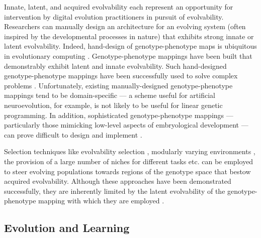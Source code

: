 Innate, latent, and acquired evolvability each represent an opportunity for intervention by digital evolution practitioners in pursuit of evolvability.
Researchers can manually design an architecture for an evolving system (often inspired by the developmental processes in nature) that exhibits strong innate \cite{clune2011performance} or latent \cite{reisinger2005towards} evolvability.
Indeed, hand-design of genotype-phenotype maps is ubiquitous in evolutionary computing \cite{wagner1996perspective}.
Genotype-phenotype mappings have been built that demonstrably exhibit latent \cite{reisinger2007acquiring} and innate \cite{stanley2009hypercube, clune2011performance} evolvability.
Such hand-designed genotype-phenotype mappings have been successfully used to solve complex problems \cite{woolley2010evolving, cheney2013unshackling}.
Unfortunately, existing manually-designed genotype-phenotype mappings tend to be domain-specific --- a scheme useful for artificial neuroevolution, for example, is not likely to be useful for linear genetic programming.
In addition, sophisticated genotype-phenotype mappings --- particularly those mimicking low-level aspects of embryological development --- can prove difficult to design and implement \cite[p 223]{downing2015intelligence}.

Selection techniques like evolvability selection \cite{mengistu2016evolvability}, modularly varying environments \cite{kashtan2005spontaneous}, the provision of a large number of niches for different tasks \cite{nguyen2015innovation} etc. can be employed to steer evolving populations towards regions of the genotype space that bestow acquired evolvability.
Although these approaches have been demonstrated successfully, they are inherently limited by the latent evolvability of the genotype-phenotype mapping with which they are employed \cite{reisinger2005towards}.

\subsection{Evolution and Learning}

